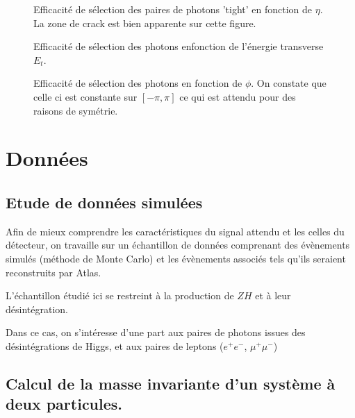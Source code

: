 \documentclass[11pt]{article} %
\begin{document}
\begin{figure}[H]
\centering
  \caption{Efficacité de sélection des paires de photons 'tight' en fonction de $\eta$. La zone de \og crack \fg est bien apparente sur cette figure. }
 \resizebox{.9\linewidth}{!}{}
\end{figure}

\begin{figure}[H]
\centering
  \caption{Efficacité de sélection des photons enfonction de l'énergie transverse $E_t$.}
 \resizebox{.9\linewidth}{!}{}
\end{figure}

\begin{figure}[H]
\centering
  \caption{}
 \resizebox{.9\linewidth}{!}{}
  \caption{Efficacité de sélection des photons en fonction de $\phi$. On constate que celle ci est constante sur $[-\pi,\pi]$ ce qui est attendu pour des raisons de symétrie.}
\end{figure}


\section{Données}

\subsection{Etude de données simulées}

Afin de mieux comprendre les caractéristiques du signal attendu et les celles du détecteur, on travaille sur un échantillon de données comprenant des évènements simulés (méthode de Monte Carlo) et les évènements associés tels qu'ils seraient reconstruits par Atlas.

L'échantillon étudié ici se restreint à la production de $ZH$ et à leur désintégration.

Dans ce cas, on s'intéresse d'une part aux paires de photons issues des désintégrations de Higgs, et aux paires de leptons ($e^+e^-$, $\mu^+\mu^-$)


\subsection{Calcul de la masse invariante d'un système à deux particules.}
\end{document}
